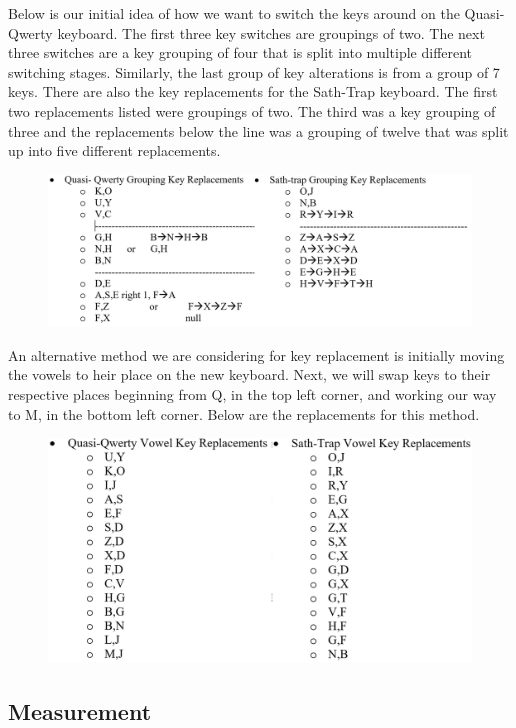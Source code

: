 Below is our initial idea of how we want to switch the keys around on the Quasi-Qwerty keyboard.  The first three key switches are groupings of two. The next three switches are a key grouping of four that is split into multiple different switching stages. Similarly, the last group of key alterations is from a group of 7 keys.  There are also the key replacements for the Sath-Trap keyboard.  The first two replacements listed were groupings of two.  The third was a key grouping of three and the replacements below the line was a grouping of twelve that was split up into five different replacements.  



\begin{figure}[ht]
	\centering
	\includegraphics [width=0.8\linewidth]{figures/group1}
	
\end{figure}

An alternative method we are considering for key replacement is initially moving the vowels to heir place on the new keyboard. Next, we will swap keys to their respective places beginning from Q, in the top left corner, and working our way to M, in the bottom left corner.  Below are the replacements for this method.  


\begin{figure}[ht]
	\centering
	\includegraphics [width=0.7\linewidth]{figures/group2}
	
\end{figure}


\subsection{Measurement}

